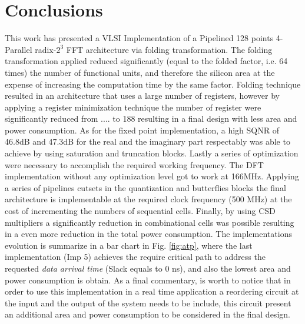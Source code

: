 \documentclass[journal,comsoc]{IEEEtran}
\begin{document}

%


	







 
\section{Conclusions} \label{sec:conclusions}
This work has presented a VLSI Implementation of a Pipelined 128 points 4-Parallel radix-$2^3$ FFT architecture via folding transformation.
The folding transformation applied reduced significantly (equal to the folded factor, i.e. 64 times) the number of functional units, and therefore the silicon area at the expense of increasing the computation time by the same factor.
Folding technique resulted in an architecture that uses a large number of registers, however by applying a register minimization technique the number of register were significantly reduced from .... to 188 resulting in a final design with less area and power consumption. As for the fixed point implementation, a high SQNR of 46.8dB and 47.3dB for the real and the imaginary part respectably was able to achieve by using saturation and truncation blocks. 
Lastly a series of optimization were necessary to accomplish the required working frequency. The DFT implementation without any optimization level got to work at 166MHz. Applying a series of pipelines cutsets in the quantization and butterflies blocks the final architecture is implementable at the required clock frequency (500 MHz) at the cost of incrementing the numbers of sequential cells. Finally, by using CSD multipliers a significantly reduction in combinational cells was possible resulting in a even more reduction in the total power consumption. 
The  implementations evolution is summarize in a bar chart in Fig. \ref{fig:atp}, where the last implementation (Imp 5) achieves the require critical path to address the requested \textit{data arrival time} (Slack equals to 0 ns), and also the lowest area and power consumption is obtain.
As a final commentary, is worth to notice that in order to use this implementation in a real time application a reordering circuit at the input and the output of the system needs to be include, this circuit present an additional area and power consumption to be considered in the final design. 
\end{document}
